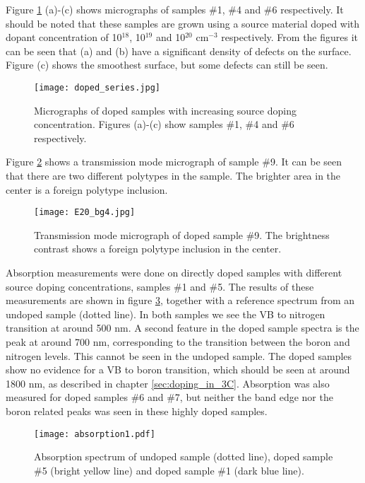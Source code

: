 Figure \ref{fig:B_doped_micrographs2} (a)-(c) shows micrographs of samples \#1, \#4 and \#6 respectively. It should be noted that these samples are grown using a source material doped with dopant concentration of 10$^{18}$, 10$^{19}$ and 10$^{20}$ cm$^{-3}$ respectively. From the figures it can be seen that (a) and (b) have a significant density of defects on the surface. Figure (c) shows the smoothest surface, but some defects can still be seen. 

\begin{figure}[h]
\begin{center}
\texttt{[image: doped\_series.jpg]}
\caption{Micrographs of doped samples with increasing source doping concentration. Figures (a)-(c) show samples \#1, \#4 and \#6 respectively.
\label{fig:B_doped_micrographs2}}
\end{center}
\end{figure}

Figure \ref{fig:BGe20_micrograph} shows a transmission mode micrograph of sample \#9. It can be seen that there are two different polytypes in the sample. The brighter area in the center is a foreign polytype inclusion. 

\begin{figure}[h]
\begin{center}
\texttt{[image: E20\_bg4.jpg]}
\caption{Transmission mode micrograph of doped sample \#9. The brightness contrast shows a foreign polytype inclusion in the center. 
\label{fig:BGe20_micrograph}}
\end{center}
\end{figure}

Absorption measurements were done on directly doped samples with different source doping concentrations, samples \#1 and \#5. The results of these measurements are shown in figure \ref{fig:abs1}, together with a reference spectrum from an undoped sample (dotted line). In both samples we see the VB to nitrogen transition at around 500 nm. A second feature in the doped sample spectra is the peak at around 700 nm, corresponding to the transition between the boron and nitrogen levels. This cannot be seen in the undoped sample. The doped samples show no evidence for a VB to boron transition, which should be seen at around 1800 nm, as described in chapter \ref{sec:doping_in_3C}. Absorption was also measured for doped samples \#6 and \#7, but neither the band edge nor the boron related peaks was seen in these highly doped samples. 

\begin{figure}[h]
\begin{center}
\texttt{[image: absorption1.pdf]}
\caption{Absorption spectrum of undoped sample (dotted line), doped sample \#5 (bright yellow line) and doped sample \#1 (dark blue line). 
\label{fig:abs1}}
\end{center}
\end{figure}

